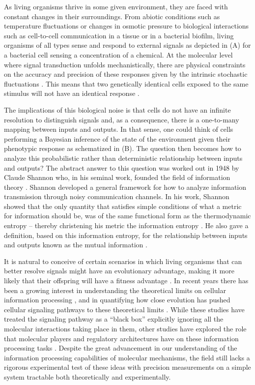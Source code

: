 As living organisms thrive in some given environment, they are faced with
constant changes in their surroundings. From abiotic conditions such as
temperature fluctuations or changes in osmotic pressure to biological
interactions such as cell-to-cell communication in a tissue or in a bacterial
biofilm, living organisms of all types sense and respond to external signals as
depicted in (A) for a bacterial cell sensing a concentration of
a chemical. At the molecular level where signal transduction unfolds
mechanistically, there are physical constraints on the accuracy and precision of
these responses given by the intrinsic stochastic fluctuations
\cite{Nemenman2010}. This means that two genetically identical cells exposed to
the same stimulus will not have an identical response \cite{Eldar2010}.

The implications of this biological noise is that cells do not have an infinite
resolution to distinguish signals and, as a consequence, there is a one-to-many
mapping between inputs and outputs. In that sense, one could think of cells
performing a Bayesian inference of the state of the environment given their
phenotypic response as schematized in (B). The question then
becomes how to analyze this probabilistic rather than deterministic relationship
between inputs and outputs? The abstract answer to this question was worked out
in 1948 by Claude Shannon who, in his seminal work, founded the field of
information theory \cite{Shannon1948}. Shannon developed a general framework for
how to analyze information transmission through noisy communication channels. In
his work, Shannon showed that the only quantity that satisfies simple conditions
of what a metric for information should be, was of the same functional form as
the thermodynamic entropy -- thereby christening his metric the information
entropy \cite{MacKay2003}. He also gave a definition, based on this information
entropy, for the relationship between inputs and outputs known as the mutual
information .

It is natural to conceive of certain scenarios in which living organisms that
can better resolve signals might have an evolutionary advantage, making it more
likely that their offspring will have a fitness advantage \cite{Taylor2007a}. In
recent years there has been a growing interest in understanding the theoretical
limits on cellular information processing \cite{Bialek2005, Gregor2007}, and in
quantifying how close evolution has pushed cellular signaling pathways to these
theoretical limits \cite{Tkacik2008, Dubuis2013, Petkova2016}. While these
studies have treated the signaling pathway as a ``black box'' explicitly
ignoring all the molecular interactions taking place in them, other studies have
explored the role that molecular players and regulatory architectures have on
these information processing tasks \cite{Rieckh2014, Ziv2007, Voliotis2014,
Tostevin2009, Tkacik2011, Tkacik2008a, Tabbaa2014}. Despite the great
advancement in our understanding of the information processing capabilities of
molecular mechanisms, the field still lacks a rigorous experimental test of
these ideas with precision measurements on a simple system tractable both
theoretically and experimentally.

